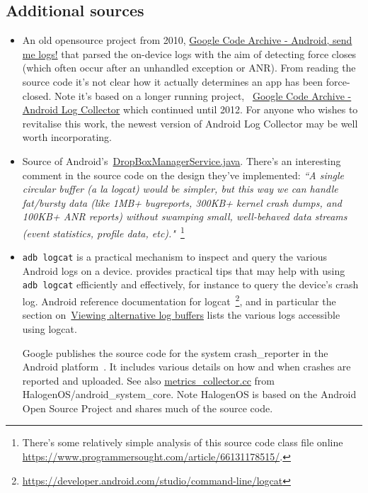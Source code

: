 \subsection{Additional sources}
\begin{itemize}
    \item An old opensource project from 2010, \href{https://code.google.com/archive/p/android-send-me-logs/}{Google Code Archive - Android, send me logs!} that parsed the on-device logs with the aim of detecting force closes (which often occur after an unhandled exception or ANR). From reading the source code it's not clear how it actually determines an app has been force-closed. Note it's based on a longer running project, ~\href{https://code.google.com/archive/p/android-log-collector/}{Google Code Archive - Android Log Collector} which continued until 2012. For anyone who wishes to revitalise this work, the newest version of Android Log Collector may be well worth incorporating.
    
    \item Source of Android's~\href{https://android.googlesource.com/platform/frameworks/base/+/master/services/core/java/com/android/server/DropBoxManagerService.java}{DropBoxManagerService.java}. There's an interesting comment in the source code on the design they've implemented: \emph{``A single circular buffer (a la logcat) would be simpler, but this way we can handle fat/bursty data (like 1MB+ bugreports, 300KB+ kernel crash dumps, and 100KB+ ANR reports) without swamping small, well-behaved data streams (event statistics, profile data, etc)."}~\footnote{There's some relatively simple analysis of this source code class file online \url{https://www.programmersought.com/article/66131178515/}.}
    
    \item \texttt{adb logcat} is a practical mechanism to inspect and query the various Android logs on a device. \citep{khan2019_medium_filtering_adb_logcat_efficiently} provides practical tips that may help with using \texttt{adb logcat} efficiently and effectively, for instance to query the device's crash log. Android reference documentation for logcat~\footnote{\url{https://developer.android.com/studio/command-line/logcat}}, and in particular the section on~\href{https://developer.android.com/studio/command-line/logcat#alternativeBuffers}{Viewing alternative log buffers} lists the various logs accessible using logcat.
    
    Google publishes the source code for the system crash\_reporter in the Android platform~\citep{android_platform_system_crash_reporter}. It includes various details on how and when crashes are reported and uploaded. See also \href{https://git.halogenos.org/halogenOS/android\_system\_core/src/commit/33c59358525052c788a2d170d326b8b1cf810dd1/metricsd/metrics_collector.cc}{metrics\_collector.cc} from HalogenOS/android\_system\_core. Note HalogenOS is based on the Android Open Source Project and shares much of the source code.
\end{itemize}

